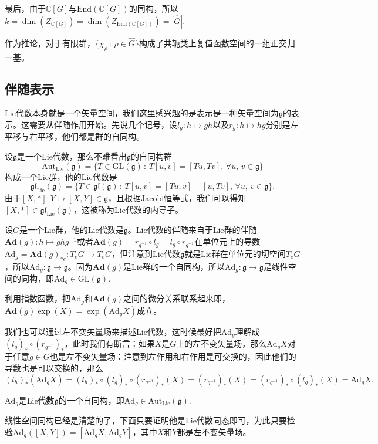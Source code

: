 \documentclass[11pt]{article}
\theoremstyle{definition}
\theoremstyle{plain}
\newcommand{\cc}{\mathbb{C}}
\newcommand{\lag}{{\mathfrak{g}}}
\begin{document}
最后，由于$\cc [G]$与$\mathrm{End}(\cc [G])$的同构，所以$k=\dim (Z_{\cc [G]})=\dim (Z_{\mathrm{End}(\cc [G])})=|\hat{G}|$.\endproof

\para 作为推论，对于有限群，$\{\chi_\rho\,:\, \rho\in \hat{G}\}$构成了共轭类上复值函数空间的一组正交归一基。

\subsection*{伴随表示}

Lie代数本身就是一个矢量空间，我们这里感兴趣的是表示是一种矢量空间为$\lag$的表示。这需要从伴随作用开始。先说几个记号，设$l_g:h\mapsto gh$以及$r_g:h\mapsto hg$分别是左平移与右平移，他们都是群的自同构。

\para 设$\lag$是一个Lie代数，那么不难看出$\lag$的自同构群
\[\mathrm{Aut}_{\mathrm{Lie}}(\lag)=\{T\in \mathrm{GL}(\lag)\,:\,T[u,v]=[Tu,Tv],\,\forall u,\,v\in\lag\}\]
构成一个Lie群，他的Lie代数是
\[\mathfrak{gl}_{\mathrm{Lie}}(\lag)=\{T\in \mathfrak{gl}(\lag)\,:\,T[u,v]=[Tu,v]+[u,Tv],\,\forall u,\,v\in\lag\}.\]
由于$[X,*]:Y\mapsto [X,Y]\in \lag$，且根据Jacobi恒等式，我们可以得知$[X,*]\in \mathfrak{gl}_{\mathrm{Lie}}(\lag)$，这被称为Lie代数的内导子。

\para 设$G$是一个Lie群，他的Lie代数是$\lag$。Lie代数的伴随来自于Lie群的伴随$\mathbf{Ad}(g):h\mapsto ghg^{-1}$或者$\mathbf{Ad}(g)=r_{g^{-1}}\circ l_g=l_g\circ r_{g^{-1}}$在单位元上的导数$\mathrm{Ad}_g=\mathbf{Ad}(g)_{*e}:T_eG\to T_eG$，但注意到Lie代数$\lag$就是Lie群在单位元的切空间$T_eG$，所以$\mathrm{Ad}_g:\lag\to \lag$。因为$\mathbf{Ad}(g)$是Lie群的一个自同构，所以$\mathrm{Ad}_g:\lag\to\lag$是线性空间的同构，即$\mathrm{Ad}_g\in \mathrm{GL}(\lag)$.

利用指数函数，把$\mathrm{Ad}_g$和$\mathbf{Ad}(g)$之间的微分关系联系起来即，$\mathbf{Ad}(g)\exp(X)=\exp(\mathrm{Ad}_gX)$成立。

\para 我们也可以通过左不变矢量场来描述Lie代数，这时候最好把$\mathrm{Ad}_g$理解成$(l_g)_*\circ (r_{g^{-1}})_*$，此时我们有断言：如果$X$是$G$上的左不变矢量场，那么$\mathrm{Ad}_gX$对于任意$g\in G$也是左不变矢量场：注意到左作用和右作用是可交换的，因此他们的导数也是可以交换的，那么
\[
	(l_h)_*(\mathrm{Ad}_gX)=(l_h)_*\circ (l_g)_*\circ (r_{g^{-1}})_*(X)=(r_{g^{-1}})_*(X)=(r_{g^{-1}})_*\circ (l_g)_*(X)=\mathrm{Ad}_gX.
\]

\para $\mathrm{Ad}_g$是Lie代数$\lag$的一个自同构，即$\mathrm{Ad}_g\in \mathrm{Aut}_{\mathrm{Lie}}(\lag)$.

线性空间同构已经是清楚的了，下面只要证明他是Lie代数同态即可，为此只要检验$\mathrm{Ad}_g([X,Y])=[\mathrm{Ad}_gX,\mathrm{Ad}_gY]$，其中$X$和$Y$都是左不变矢量场。
\end{document}
